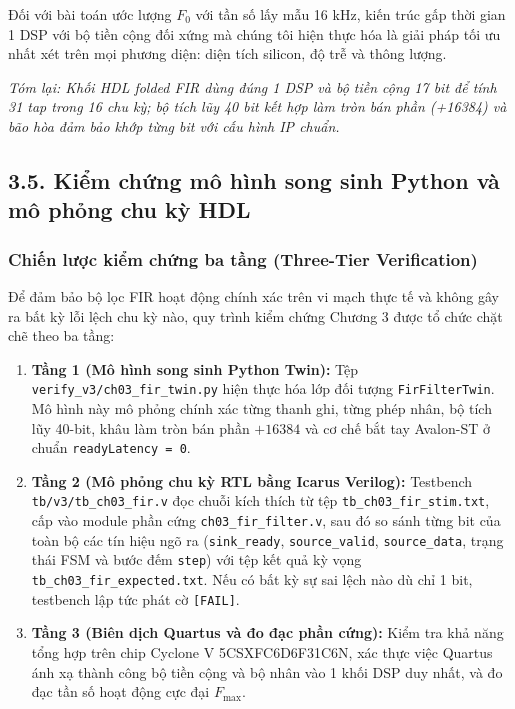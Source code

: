 Đối với bài toán ước lượng $F_0$ với tần số lấy mẫu 16 kHz, kiến trúc gấp thời gian 1 DSP với bộ tiền cộng đối xứng mà chúng tôi hiện thực hóa là giải pháp tối ưu nhất xét trên mọi phương diện: diện tích silicon, độ trễ và thông lượng.

\textit{Tóm lại: Khối HDL folded FIR dùng đúng 1 DSP và bộ tiền cộng 17 bit để tính 31 tap trong 16 chu kỳ; bộ tích lũy 40 bit kết hợp làm tròn bán phần (+16384) và bão hòa đảm bảo khớp từng bit với cấu hình IP chuẩn.}

\subsection*{3.5. Kiểm chứng mô hình song sinh Python và mô phỏng chu kỳ HDL}

\subsubsection*{Chiến lược kiểm chứng ba tầng (Three-Tier Verification)}
Để đảm bảo bộ lọc FIR hoạt động chính xác trên vi mạch thực tế và không gây ra bất kỳ lỗi lệch chu kỳ nào, quy trình kiểm chứng Chương 3 được tổ chức chặt chẽ theo ba tầng:
\begin{enumerate}[leftmargin=1.5em, itemsep=2pt]
    \item \textbf{Tầng 1 (Mô hình song sinh Python Twin):} Tệp \texttt{verify\_v3/ch03\_fir\_twin.py} hiện thực hóa lớp đối tượng \texttt{FirFilterTwin}. Mô hình này mô phỏng chính xác từng thanh ghi, từng phép nhân, bộ tích lũy 40-bit, khâu làm tròn bán phần $+16384$ và cơ chế bắt tay Avalon-ST ở chuẩn \texttt{readyLatency = 0}.
    \item \textbf{Tầng 2 (Mô phỏng chu kỳ RTL bằng Icarus Verilog):} Testbench \texttt{tb/v3/tb\_ch03\_fir.v} đọc chuỗi kích thích từ tệp \texttt{tb\_ch03\_fir\_stim.txt}, cấp vào module phần cứng \texttt{ch03\_fir\_filter.v}, sau đó so sánh từng bit của toàn bộ các tín hiệu ngõ ra (\texttt{sink\_ready}, \texttt{source\_valid}, \texttt{source\_data}, trạng thái FSM và bước đếm \texttt{step}) với tệp kết quả kỳ vọng \texttt{tb\_ch03\_fir\_expected.txt}. Nếu có bất kỳ sự sai lệch nào dù chỉ 1 bit, testbench lập tức phát cờ \texttt{[FAIL]}.
    \item \textbf{Tầng 3 (Biên dịch Quartus và đo đạc phần cứng):} Kiểm tra khả năng tổng hợp trên chip Cyclone V 5CSXFC6D6F31C6N, xác thực việc Quartus ánh xạ thành công bộ tiền cộng và bộ nhân vào 1 khối DSP duy nhất, và đo đạc tần số hoạt động cực đại $F_{\max}$.
\end{enumerate}

